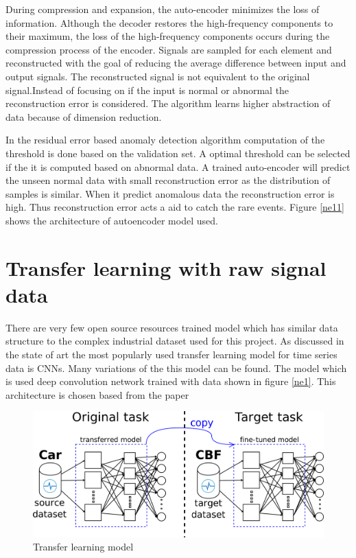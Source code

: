     
    During compression and expansion, the auto-encoder minimizes the loss of information. Although the decoder restores the high-frequency components to their maximum, the loss of the high-frequency components occurs during the compression process of the encoder. Signals are sampled for each element and reconstructed with the goal of reducing the average difference between input and output signals. The reconstructed signal is not equivalent to the original signal.Instead of focusing on if the input is normal or abnormal the reconstruction error is considered. The algorithm learns higher abstraction of data because of dimension reduction.
    
    In the residual error based anomaly detection algorithm computation of the threshold is done based on the validation set. A optimal threshold can be selected if the it is computed based on abnormal data. A trained auto-encoder will predict the unseen normal data with small reconstruction error as the distribution of samples is similar. When it predict anomalous data the reconstruction error is high. Thus reconstruction error acts a aid to catch the rare events. 
    Figure \ref{ne11} shows the architecture of autoencoder model used. 
   
  
  
   \section{Transfer learning with raw signal data}
There are very few open source resources trained model which has similar data structure to the complex industrial dataset used for this project. As discussed in the state of art the most popularly used transfer learning model for time series data is CNNs. Many variations of the this model can be found. The model which is used deep convolution network trained with data shown in figure \ref{ne1}. This architecture is chosen based from the paper \cite{fawaz2018transfer}

  \begin{figure}[h]
  	\centering
  	\includegraphics[width=0.9\linewidth]{images/transferss.png}
  	\caption{Transfer learning model \cite{oh2018residual} }
  	\label{n01}
  \end{figure}
   
